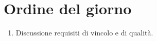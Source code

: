 \section{Ordine del giorno}

\begin{enumerate}
    \item Discussione requisiti di vincolo e di qualità.
\end{enumerate}